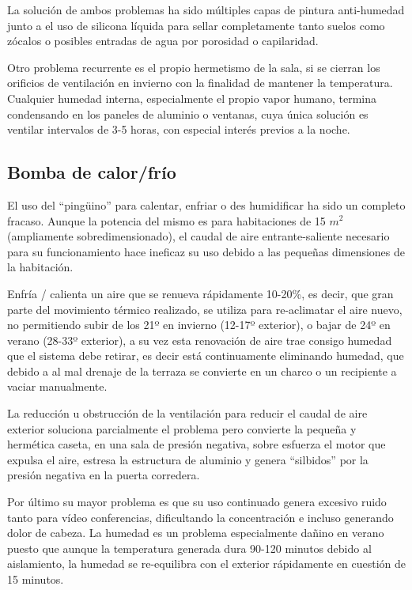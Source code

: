 La solución de ambos problemas ha sido múltiples capas de pintura anti-humedad junto a el uso de silicona líquida para sellar completamente tanto suelos como zócalos o posibles entradas de agua por porosidad o capilaridad.

Otro problema recurrente es el propio hermetismo de la sala, si se cierran los orificios de ventilación en invierno con la finalidad de mantener la temperatura. Cualquier humedad interna, especialmente el propio vapor humano, termina condensando en los paneles de aluminio o ventanas, cuya única solución es ventilar intervalos de 3-5 horas, con especial interés previos a la noche.

\subsection{Bomba de calor/frío}\label{S:cambios_bombacalor}
El uso del “pingüino” para calentar, enfriar o des humidificar ha sido un completo fracaso. Aunque la potencia del mismo es para habitaciones de 15 {\rm$m^{2}$} (ampliamente sobredimensionado), el caudal de aire entrante-saliente necesario para su funcionamiento hace ineficaz su uso debido a las pequeñas dimensiones de la habitación.

Enfría / calienta un aire que se renueva rápidamente 10-20\%, es decir, que gran parte del movimiento térmico realizado, se utiliza para re-aclimatar el aire nuevo, no permitiendo subir de los 21º en invierno (12-17º exterior), o bajar de 24º en verano (28-33º exterior), a su vez esta renovación de aire trae consigo humedad que el sistema debe retirar, es decir está continuamente eliminando humedad, que debido a al mal drenaje de la terraza se convierte en un charco o un recipiente a vaciar manualmente.

La reducción u obstrucción de la ventilación para reducir el caudal de aire exterior soluciona parcialmente el problema pero convierte la pequeña y hermética caseta, en una sala de presión negativa, sobre esfuerza el motor que expulsa el aire, estresa la estructura de aluminio y genera “silbidos”  por la presión negativa en la puerta corredera. 

Por último su mayor problema es que su uso continuado genera excesivo ruido tanto para vídeo conferencias, dificultando la concentración e incluso generando dolor de cabeza. La humedad es un problema especialmente dañino en verano puesto que aunque la temperatura generada dura 90-120 minutos debido al aislamiento, la humedad se re-equilibra con el exterior rápidamente en cuestión de 15 minutos.

